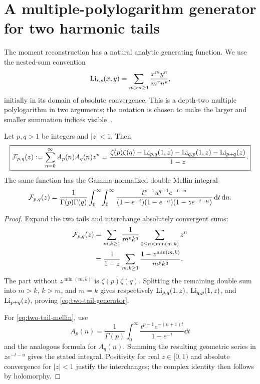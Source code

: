 \section{A multiple-polylogarithm generator for two harmonic tails}
\label{sec:polylog-generator}

The moment reconstruction has a natural analytic generating function.
We use the nested-sum convention
\begin{equation}
 \operatorname{Li}_{r,s}(x,y)=
 \sum_{m>n\ge1}\frac{x^m y^n}{m^r n^s},
 \label{eq:two-variable-mpl}
\end{equation}
initially in its domain of absolute convergence.  This is a depth-two
multiple polylogarithm in two arguments; the notation is chosen to make
the larger and smaller summation indices visible~\cite{Goncharov,BorweinMPL}.

\begin{theorem}
\label{thm:two-tail-generator}
Let $p,q>1$ be integers and $|z|<1$.  Then
\begin{equation}
 \boxed{\displaystyle
 \mathcal{F}_{p,q}(z):=\sum_{n=0}^{\infty}A_p(n)A_q(n)z^n
 =\frac{\zeta(p)\zeta(q)
 -\operatorname{Li}_{p,q}(1,z)-\operatorname{Li}_{q,p}(1,z)-\operatorname{Li}_{p+q}(z)}{1-z}.}
 \label{eq:two-tail-generator}
\end{equation}
The same function has the Gamma-normalized double Mellin integral
\begin{equation}
 \mathcal{F}_{p,q}(z)=
 \frac1{\Gamma(p)\Gamma(q)}
 \int_0^\infty\!\int_0^\infty
 \frac{t^{p-1}u^{q-1}e^{-t-u}}
 {(1-e^{-t})(1-e^{-u})(1-ze^{-t-u})}
 \,\mathrm{d} t\,\mathrm{d} u.
 \label{eq:two-tail-mellin}
\end{equation}
\end{theorem}

\begin{proof}
Expand the two tails and interchange absolutely convergent sums:
\begin{align*}
 \mathcal{F}_{p,q}(z)
 &=\sum_{m,k\ge1}\frac1{m^pk^q}
   \sum_{0\le n<\min(m,k)}z^n\\
 &=\frac1{1-z}\sum_{m,k\ge1}
   \frac{1-z^{\min(m,k)}}{m^pk^q}.
\end{align*}
The part without $z^{\min(m,k)}$ is $\zeta(p)\zeta(q)$.  Splitting the
remaining double sum into $m>k$, $k>m$, and $m=k$ gives respectively
$\operatorname{Li}_{p,q}(1,z)$, $\operatorname{Li}_{q,p}(1,z)$, and $\operatorname{Li}_{p+q}(z)$, proving
\eqref{eq:two-tail-generator}.

For \eqref{eq:two-tail-mellin}, use
\[
 A_p(n)=\frac1{\Gamma(p)}\int_0^\infty
 \frac{t^{p-1}e^{-(n+1)t}}{1-e^{-t}}\dd t
\]
and the analogous formula for $A_q(n)$.  Summing the resulting geometric
series in $ze^{-t-u}$ gives the stated integral.  Positivity for real
$z\in[0,1)$ and absolute convergence for $|z|<1$ justify the
interchanges; the complex identity then follows by holomorphy.
\end{proof}

